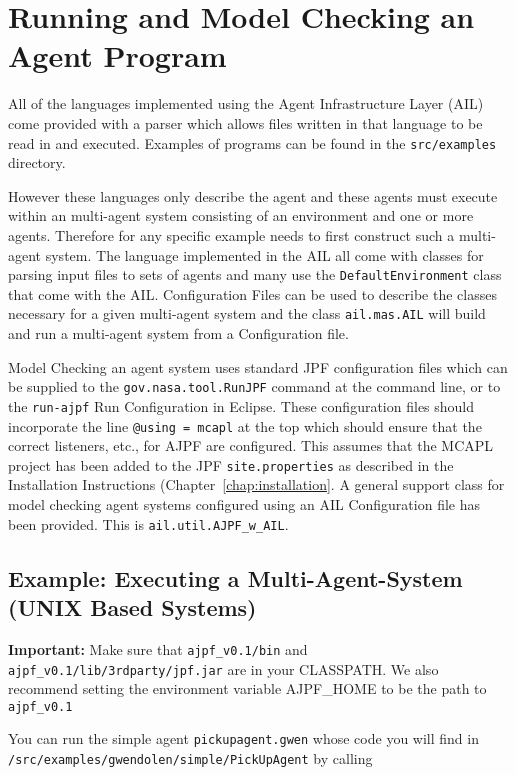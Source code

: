 \chapter{Running and Model Checking an Agent Program}
\label{chap:running}

All of the languages implemented using the Agent Infrastructure Layer (AIL) come provided with a parser which allows files written in that language to be read in and executed.  Examples of programs can be found in the \texttt{src/examples} directory.

However these languages only describe the agent and these agents must execute within an multi-agent system consisting of an environment and one or more agents.  Therefore for any specific example needs to first construct such a multi-agent system.  The language implemented in the AIL all come with classes for parsing input files to sets of agents and many use the \texttt{DefaultEnvironment} class that come with the AIL. Configuration Files can be used to describe the classes necessary  for a given multi-agent system and the class \texttt{ail.mas.AIL} will build and run a multi-agent system from a Configuration file.

Model Checking an agent system uses standard JPF configuration files which can be supplied to the \texttt{gov.nasa.tool.RunJPF} command at the command line, or to the \texttt{run-ajpf} Run Configuration in Eclipse.  These configuration files should incorporate the line \texttt{@using = mcapl} at the top which should ensure that the correct listeners, etc., for AJPF are configured.  This assumes that the MCAPL project has been added to the JPF \texttt{site.properties} as described in the Installation Instructions (Chapter~\ref{chap:installation}.  A general support class for model checking agent systems configured using an AIL Configuration file has been provided.  This is \texttt{ail.util.AJPF\_w\_AIL}. 

\section{Example: Executing a Multi-Agent-System (UNIX Based Systems)}
{\bf Important:} Make sure that \texttt{ajpf\_v0.1/bin} and \texttt{ajpf\_v0.1/lib/3rdparty/jpf.jar} are in your CLASSPATH.  We also recommend setting the environment variable AJPF\_HOME to be the path to \texttt{ajpf\_v0.1}

You can run the simple agent \texttt{pickupagent.gwen} whose code you will find in \texttt{/src/examples/gwendolen/simple/PickUpAgent} by calling


